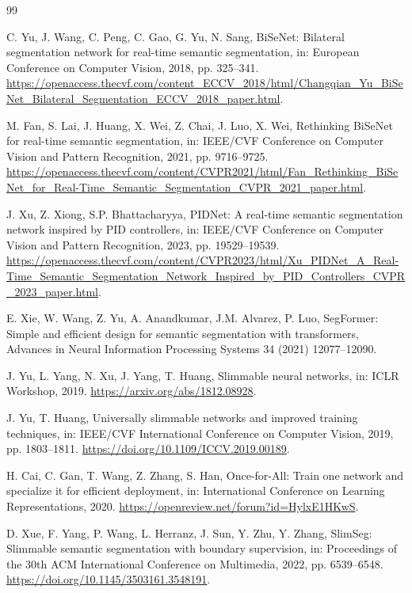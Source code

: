 \documentclass[a4paper,review,12pt]{elsarticle}
\begin{document}
\begin{thebibliography}{99}

C. Yu, J. Wang, C. Peng, C. Gao, G. Yu, N. Sang,
BiSeNet: Bilateral segmentation network for real-time semantic segmentation,
in: European Conference on Computer Vision, 2018, pp. 325--341.
\url{https://openaccess.thecvf.com/content_ECCV_2018/html/Changqian_Yu_BiSeNet_Bilateral_Segmentation_ECCV_2018_paper.html}.

M. Fan, S. Lai, J. Huang, X. Wei, Z. Chai, J. Luo, X. Wei,
Rethinking BiSeNet for real-time semantic segmentation,
in: IEEE/CVF Conference on Computer Vision and Pattern Recognition, 2021, pp. 9716--9725.
\url{https://openaccess.thecvf.com/content/CVPR2021/html/Fan_Rethinking_BiSeNet_for_Real-Time_Semantic_Segmentation_CVPR_2021_paper.html}.

J. Xu, Z. Xiong, S.P. Bhattacharyya,
PIDNet: A real-time semantic segmentation network inspired by PID controllers,
in: IEEE/CVF Conference on Computer Vision and Pattern Recognition, 2023, pp. 19529--19539.
\url{https://openaccess.thecvf.com/content/CVPR2023/html/Xu_PIDNet_A_Real-Time_Semantic_Segmentation_Network_Inspired_by_PID_Controllers_CVPR_2023_paper.html}.

E. Xie, W. Wang, Z. Yu, A. Anandkumar, J.M. Alvarez, P. Luo,
SegFormer: Simple and efficient design for semantic segmentation with transformers,
Advances in Neural Information Processing Systems 34 (2021) 12077--12090.

J. Yu, L. Yang, N. Xu, J. Yang, T. Huang,
Slimmable neural networks,
in: ICLR Workshop, 2019.
\url{https://arxiv.org/abs/1812.08928}.

J. Yu, T. Huang,
Universally slimmable networks and improved training techniques,
in: IEEE/CVF International Conference on Computer Vision, 2019, pp. 1803--1811.
\url{https://doi.org/10.1109/ICCV.2019.00189}.

H. Cai, C. Gan, T. Wang, Z. Zhang, S. Han,
Once-for-All: Train one network and specialize it for efficient deployment,
in: International Conference on Learning Representations, 2020.
\url{https://openreview.net/forum?id=HylxE1HKwS}.

D. Xue, F. Yang, P. Wang, L. Herranz, J. Sun, Y. Zhu, Y. Zhang,
SlimSeg: Slimmable semantic segmentation with boundary supervision,
in: Proceedings of the 30th ACM International Conference on Multimedia, 2022, pp. 6539--6548.
\url{https://doi.org/10.1145/3503161.3548191}.


\end{thebibliography}
\end{document}
